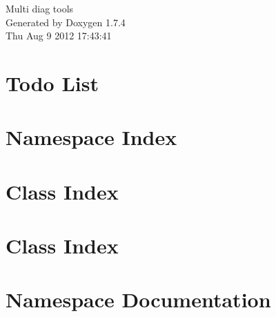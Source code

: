 \documentclass[a4paper]{book}
\begin{document}
\hypersetup{pageanchor=false}
\begin{titlepage}
\vspace*{7cm}
\begin{center}
{\Large Multi diag tools }\\
\vspace*{1cm}
{\large Generated by Doxygen 1.7.4}\\
\vspace*{0.5cm}
{\small Thu Aug 9 2012 17:43:41}\\
\end{center}
\end{titlepage}
\clearemptydoublepage
{}
\tableofcontents
\clearemptydoublepage
{}
\hypersetup{pageanchor=true}
\chapter{Todo List}
\label{todo}
\hypertarget{todo}{}

\chapter{Namespace Index}

\chapter{Class Index}

\chapter{Class Index}

\chapter{Namespace Documentation}

\end{document}

